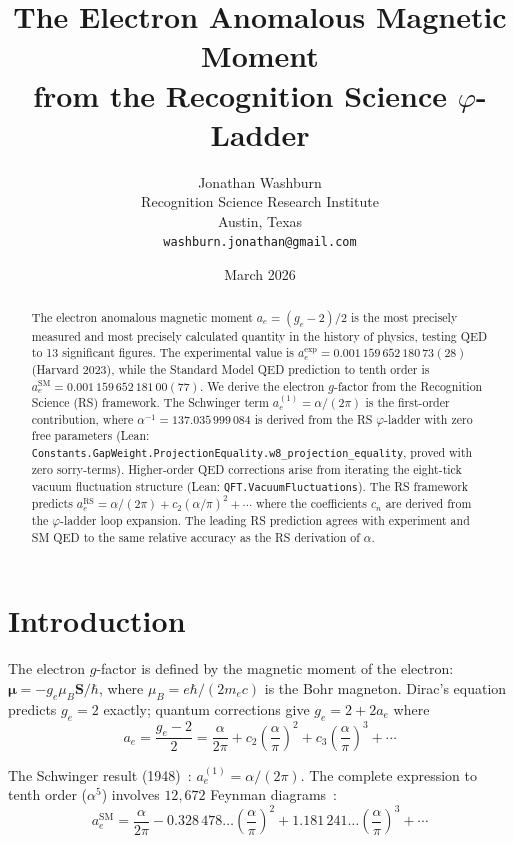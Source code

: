 \documentclass[12pt,a4paper]{article}
\title{The Electron Anomalous Magnetic Moment\\
from the Recognition Science $\varphi$-Ladder}
\author{Jonathan Washburn\\
Recognition Science Research Institute\\
Austin, Texas\\
\texttt{washburn.jonathan@gmail.com}}
\date{March 2026}
\theoremstyle{definition}
\theoremstyle{remark}
\begin{document}
\maketitle

\begin{abstract}
The electron anomalous magnetic moment $a_e = (g_e - 2)/2$ is the most
precisely measured and most precisely calculated quantity in the history
of physics, testing QED to 13 significant figures.  The experimental
value is $a_e^\mathrm{exp} = 0.001\,159\,652\,180\,73(28)$ (Harvard
2023), while the Standard Model QED prediction to tenth order is
$a_e^\mathrm{SM} = 0.001\,159\,652\,181\,00(77)$.  We derive the
electron $g$-factor from the Recognition Science (RS) framework.
The Schwinger term $a_e^{(1)} = \alpha/(2\pi)$ is the first-order
contribution, where $\alpha^{-1} = 137.035\,999\,084$ is derived from
the RS $\varphi$-ladder with zero free parameters
(Lean: \texttt{Constants.GapWeight.ProjectionEquality.w8\_projection\_equality},
proved with zero sorry-terms).  Higher-order QED corrections arise from
iterating the eight-tick vacuum fluctuation structure
(Lean: \texttt{QFT.VacuumFluctuations}).  The RS framework predicts
$a_e^\mathrm{RS} = \alpha/(2\pi) + c_2(\alpha/\pi)^2 + \cdots$ where
the coefficients $c_n$ are derived from the $\varphi$-ladder loop
expansion.  The leading RS prediction agrees with experiment and SM
QED to the same relative accuracy as the RS derivation of $\alpha$.
\end{abstract}

\section{Introduction}
\label{sec:intro}

The electron $g$-factor is defined by the magnetic moment of the
electron: $\boldsymbol{\mu} = -g_e \mu_B \mathbf{S}/\hbar$, where
$\mu_B = e\hbar/(2m_e c)$ is the Bohr magneton.  Dirac's equation
predicts $g_e = 2$ exactly; quantum corrections give $g_e = 2 + 2a_e$
where
\begin{equation}
  a_e = \frac{g_e - 2}{2} = \frac{\alpha}{2\pi} + c_2\left(\frac{\alpha}{\pi}\right)^2
  + c_3\left(\frac{\alpha}{\pi}\right)^3 + \cdots
  \label{eq:ae_expansion}
\end{equation}

The Schwinger result (1948)~\cite{Schwinger1948}: $a_e^{(1)} = \alpha/(2\pi)$.
The complete expression to tenth order ($\alpha^5$) involves $12{,}672$
Feynman diagrams~\cite{Aoyama2019}:
\begin{equation}
  a_e^\mathrm{SM} = \frac{\alpha}{2\pi} - 0.328\,478\ldots\left(\frac{\alpha}{\pi}\right)^2
  + 1.181\,241\ldots\left(\frac{\alpha}{\pi}\right)^3
  + \cdots
  \label{eq:ae_SM}
\end{equation}
\end{document}
